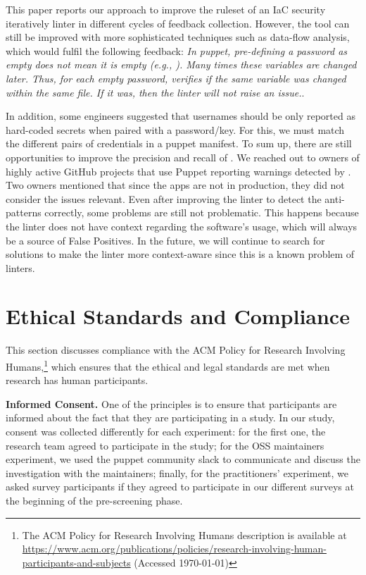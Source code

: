 This paper reports our approach to improve the ruleset of an IaC security iteratively 
linter in different cycles of feedback collection.
However, the tool can still be improved with more sophisticated 
techniques such as data-flow analysis, which would fulfil the following 
feedback: \textit{In puppet, pre-defining a password as empty does not 
mean it is empty (e.g., ). Many times 
these variables are changed later. Thus, for each empty password,
\toolname{} verifies if the same variable was changed within the same file.
If it was, then the linter will not raise an issue.}.

In addition, some engineers suggested that usernames 
should be only reported as hard-coded secrets when 
paired with a password/key. For this, we must match the different 
pairs of credentials in a puppet manifest.
To sum up, there are still opportunities 
to improve the precision and recall of \toolname.
We reached out to owners of highly 
active GitHub projects that use Puppet reporting warnings 
detected by \toolname{}. Two owners mentioned that 
since the apps are not in production, they 
did not consider the issues relevant. Even 
after improving the linter to detect the anti-patterns 
correctly, some problems are still not problematic. This happens  
because the linter does not have context regarding 
the software's usage, which will always be a source 
of False Positives. In the future, we will continue to search 
for solutions to make the linter more context-aware
since this is a known problem of linters.

\section{Ethical Standards and Compliance}\label{sec:ethics}

This section discusses compliance with the ACM Policy for Research 
Involving Humans,\footnote{The ACM Policy for Research Involving Humans description is available at \url{https://www.acm.org/publications/policies/research-involving-human-participants-and-subjects} (Accessed \today)} which ensures that the ethical and legal standards 
are met when research has human participants.

\textbf{Informed Consent.} One of the principles is to ensure that 
participants are informed about the fact that they are participating 
in a study. In our study, consent was collected differently for each 
experiment: for the first one, the research team agreed to 
participate in the study; for the OSS maintainers experiment, we used 
the puppet community slack to communicate and discuss the investigation 
with the maintainers; finally, for the practitioners' experiment, we 
asked survey participants if they agreed to participate in our different 
surveys at the beginning of the pre-screening phase. 

